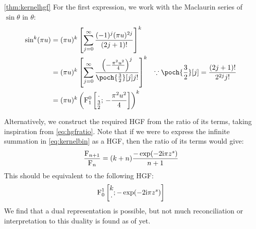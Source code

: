 \begin{proofof}{\autoref{thm:kernelhgf}}
    For the first expression, we work with the Maclaurin series of $\sin \theta$ in $\theta$:
    \begin{align*}
        \sin^k(\pi u) &= (\pi u)^k \left[ \sum_{j=0}^{\infty} \frac{(-1)^j (\pi u)^{2j}}{(2j+1)!} \right]^k\\
        &= (\pi u)^k \left[ \sum_{j=0}^\infty {\left( -\frac{\pi^2 u^2}{4} \right)^j \over \poch{\frac{3}{2}}[j] j! } \right]^k & \because \poch{\frac{3}{2}}[j] = {(2j+1)! \over 2^{2j} j!}\\
        &= (\pi u)^k \left( \Fhyp^0_1 \left[ \begin{matrix} \cdot \\ \frac{3}{2} \end{matrix}; \, -\frac{\pi^2 u^2}{4}\right] \right)^k
    \end{align*}

    Alternatively, we construct the required HGF from the ratio of its terms, taking inspiration from \autoref{eq:hgfratio}. Note that if we were to express the infinite summation in \autoref{eq:kernelbin} as a HGF, then the ratio of its terms would give:
    \[ \frac{\operatorname{F}_{n+1}}{\operatorname{F}_n} = (k+n) \frac{- \exp(-2 \mathrm i \pi z^s) }{n+1} \]
    This should be equivalent to the following HGF:
    \[ \operatorname{F}^1_0 \left[ \begin{matrix}k\\ \cdot\end{matrix};  -\exp(-2 \mathrm i \pi z^s) \right] \]
    We find that a dual representation is possible, but not much reconciliation or interpretation to this duality is found as of yet.
\end{proofof}

